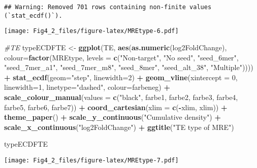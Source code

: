\documentclass[
]{article}
\newenvironment{Shaded}{\begin{snugshade}}{\end{snugshade}}
\newcommand{\AttributeTok}[1]{\textcolor[rgb]{0.13,0.29,0.53}{#1}}
\newcommand{\CommentTok}[1]{\textcolor[rgb]{0.56,0.35,0.01}{\textit{#1}}}
\newcommand{\DecValTok}[1]{\textcolor[rgb]{0.00,0.00,0.81}{#1}}
\newcommand{\FunctionTok}[1]{\textcolor[rgb]{0.13,0.29,0.53}{\textbf{#1}}}
\newcommand{\NormalTok}[1]{#1}
\newcommand{\OtherTok}[1]{\textcolor[rgb]{0.56,0.35,0.01}{#1}}
\newcommand{\SpecialCharTok}[1]{\textcolor[rgb]{0.81,0.36,0.00}{\textbf{#1}}}
\newcommand{\StringTok}[1]{\textcolor[rgb]{0.31,0.60,0.02}{#1}}
\begin{document}
\begin{verbatim}
## Warning: Removed 701 rows containing non-finite values (`stat_ecdf()`).
\end{verbatim}

\texttt{[image: Fig4\_2\_files/figure-latex/MREtype-6.pdf]}

\begin{Shaded}
\begin{Highlighting}[]
\CommentTok{\#TE}
\NormalTok{typeECDFTE }\OtherTok{\textless{}{-}} \FunctionTok{ggplot}\NormalTok{(TE, }\FunctionTok{aes}\NormalTok{(}\FunctionTok{as.numeric}\NormalTok{(log2FoldChange), }
                              \AttributeTok{colour=}\FunctionTok{factor}\NormalTok{(MREtype, }\AttributeTok{levels =} \FunctionTok{c}\NormalTok{(}\StringTok{"Non{-}target"}\NormalTok{, }\StringTok{"No seed"}\NormalTok{, }\StringTok{"seed\_6mer"}\NormalTok{, }\StringTok{"seed\_7mer\_a1"}\NormalTok{, }\StringTok{"seed\_7mer\_m8"}\NormalTok{, }\StringTok{"seed\_8mer"}\NormalTok{, }\StringTok{"seed\_alt\_38"}\NormalTok{, }\StringTok{"Multiple"}\NormalTok{)))) }\SpecialCharTok{+} 
  \FunctionTok{stat\_ecdf}\NormalTok{(}\AttributeTok{geom=}\StringTok{"step"}\NormalTok{, }\AttributeTok{linewidth=}\DecValTok{2}\NormalTok{) }\SpecialCharTok{+}
  \FunctionTok{geom\_vline}\NormalTok{(}\AttributeTok{xintercept =} \DecValTok{0}\NormalTok{, }\AttributeTok{linewidth=}\DecValTok{1}\NormalTok{, }\AttributeTok{linetype=}\StringTok{"dashed"}\NormalTok{, }\AttributeTok{colour=}\NormalTok{farbeneg) }\SpecialCharTok{+}
  \FunctionTok{scale\_colour\_manual}\NormalTok{(}\AttributeTok{values =} \FunctionTok{c}\NormalTok{(}\StringTok{"black"}\NormalTok{, farbe1, farbe2, farbe3, farbe4, farbe5, farbe6, farbe7)) }\SpecialCharTok{+}
  \FunctionTok{coord\_cartesian}\NormalTok{(}\AttributeTok{xlim =} \FunctionTok{c}\NormalTok{(}\SpecialCharTok{{-}}\NormalTok{xlim, xlim)) }\SpecialCharTok{+} 
  \FunctionTok{theme\_paper}\NormalTok{() }\SpecialCharTok{+}
  \FunctionTok{scale\_y\_continuous}\NormalTok{(}\StringTok{"Cumulative density"}\NormalTok{) }\SpecialCharTok{+} \FunctionTok{scale\_x\_continuous}\NormalTok{(}\StringTok{"log2FoldChange"}\NormalTok{) }\SpecialCharTok{+}
  \FunctionTok{ggtitle}\NormalTok{(}\StringTok{"TE type of MRE"}\NormalTok{)}

\NormalTok{typeECDFTE}
\end{Highlighting}
\end{Shaded}

\texttt{[image: Fig4\_2\_files/figure-latex/MREtype-7.pdf]}
\end{document}
